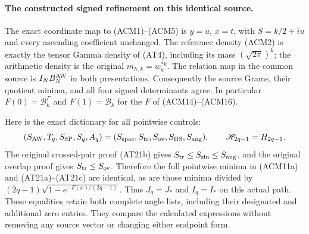 \paragraph{The constructed signed refinement on this identical source.}
The exact coordinate map to (ACM1)--(ACM5) is $y=u$, $x=t$,
with $S=k/2+iu$ and every ascending coefficient unchanged.
The reference density (ACM2) is exactly the tensor Gamma density
of (AT4), including its mass $(\sqrt{2\pi})^k$; the arithmetic
density is the original $m_{h,k}=w_h^{*k}$. The relation map in
the common source is $I_NB_N^{\rm AW}$ in both presentations.
Consequently the source Grams, their quotient minima, and all
four signed determinants agree. In particular $F(0)=\mathcal B_k^\Gamma$
and $F(1)=\mathcal B_k$ for the $F$ of (ACM14)--(ACM16).

Here is the exact dictionary for all pointwise controls:
\[
 (S_{\rm AW},T_q,S_{\rm SP},S_q,A_q)
 =(S_{\rm spec},S_{\rm tr},S_{\rm ov},S_{\rm HS},S_{\rm ang}),
 \qquad \mathscr H_{2q-1}=H_{2q-1}.
\]
The original crossed-pair proof (AT21b) gives
$S_{\rm tr}\le S_{\rm sin}\le S_{\rm ang}$, and the original
overlap proof gives $S_{\rm tr}\le S_{\rm ov}$. Therefore the
full pointwise minima in (ACM11a) and (AT21a)--(AT21c) are
identical, as are those minima divided by
$(2q-1)\sqrt{1-e^{-F(x)/(2q-1)}}$. Thus $J_q=J_*$ and $I_q=I_*$
on this actual path. These equalities retain both complete angle
lists, including their designated and additional zero entries.
They compare the calculated expressions without removing any
source vector or changing either endpoint form.

